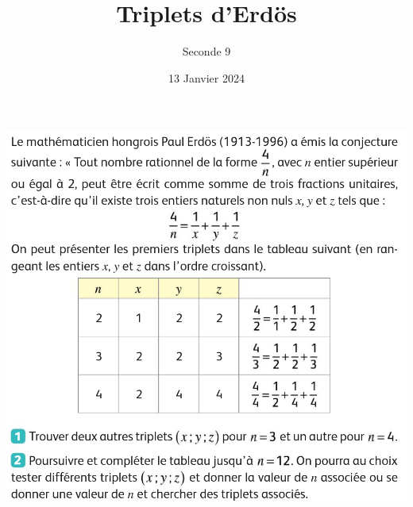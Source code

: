 \documentclass{article}
\title{Triplets d'Erdös}
\author{Seconde 9}
\date{13 Janvier 2024}
\begin{document}
\maketitle

\begin{center}
\includegraphics[width=\textwidth]{Exercice.png}
\end{center}
\end{document}

